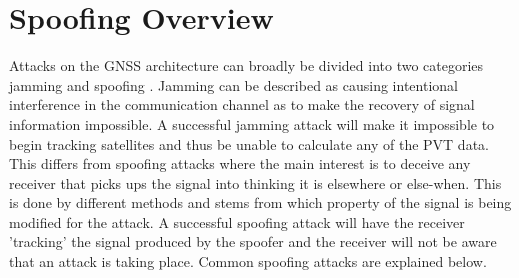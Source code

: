 

\section{Spoofing Overview}
Attacks on the GNSS architecture can broadly be divided into two categories jamming and spoofing \cite{RN33} \cite{RN32}. Jamming can be described as causing intentional
interference in the communication channel as to make the recovery of signal information impossible. A successful jamming attack will make it impossible to begin tracking
satellites and thus be unable to calculate any of the PVT data. This differs from spoofing attacks where the main interest is to deceive any receiver that picks ups the
signal into thinking it is elsewhere or else-when. This is done by different methods and stems from which property of the signal is being modified for the attack. A
successful spoofing attack will have the receiver 'tracking' the signal produced by the spoofer and the receiver will not be aware that an attack is taking place. Common
spoofing attacks are explained below.

